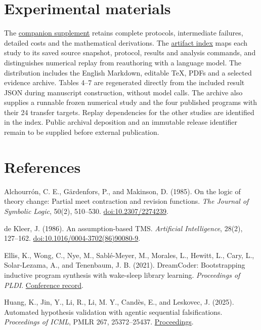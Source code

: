 \documentclass[11pt,a4paper]{article}
\begin{document}
\section*{Experimental materials}

The \hyperlink{artifact-1}{companion supplement} retains complete protocols, intermediate failures, detailed costs and the mathematical derivations. The \hyperlink{artifact-2}{artifact index} maps each study to its saved source snapshot, protocol, results and analysis commands, and distinguishes numerical replay from reauthoring with a language model. The distribution includes the English Markdown, editable TeX, PDFs and a selected evidence archive. Tables 4–7 are regenerated directly from the included result JSON during manuscript construction, without model calls. The archive also supplies a runnable frozen numerical study and the four published programs with their 24 transfer targets. Replay dependencies for the other studies are identified in the index. Public archival deposition and an immutable release identifier remain to be supplied before external publication.


\section*{References}

\begingroup\small\raggedright

Alchourrón, C. E., Gärdenfors, P., and Makinson, D. (1985). On the logic of theory change: Partial meet contraction and revision functions. \emph{The Journal of Symbolic Logic}, 50(2), 510–530. \href{https://doi.org/10.2307/2274239}{doi:10.2307/2274239}.


de Kleer, J. (1986). An assumption-based TMS. \emph{Artificial Intelligence}, 28(2), 127–162. \href{https://doi.org/10.1016/0004-3702(86)90080-9}{doi:10.1016/0004-3702(86)90080-9}.


Ellis, K., Wong, C., Nye, M., Sablé-Meyer, M., Morales, L., Hewitt, L., Cary, L., Solar-Lezama, A., and Tenenbaum, J. B. (2021). DreamCoder: Bootstrapping inductive program synthesis with wake-sleep library learning. \emph{Proceedings of PLDI}. \href{https://www.pldi21.org/poster_pldi.355.html}{Conference record}.


Huang, K., Jin, Y., Li, R., Li, M. Y., Candès, E., and Leskovec, J. (2025). Automated hypothesis validation with agentic sequential falsifications. \emph{Proceedings of ICML}, PMLR 267, 25372–25437. \href{https://proceedings.mlr.press/v267/huang25n.html}{Proceedings}.
\end{document}
